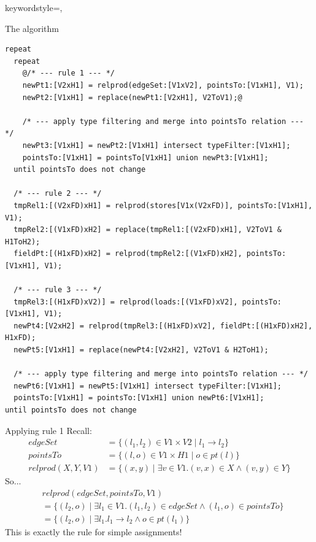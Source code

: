 \documentclass{beamer}
\begin{document}
 {
    keywordstyle=\color{red},
}

\begin{frame}[fragile]{The algorithm}
\begin{lstlisting}[style=base]
repeat
  repeat
    @/* --- rule 1 --- */
    newPt1:[V2xH1] = relprod(edgeSet:[V1xV2], pointsTo:[V1xH1], V1);
    newPt2:[V1xH1] = replace(newPt1:[V2xH1], V2ToV1);@

    /* --- apply type filtering and merge into pointsTo relation --- */
    newPt3:[V1xH1] = newPt2:[V1xH1] intersect typeFilter:[V1xH1];
    pointsTo:[V1xH1] = pointsTo[V1xH1] union newPt3:[V1xH1];
  until pointsTo does not change

  /* --- rule 2 --- */
  tmpRel1:[(V2xFD)xH1] = relprod(stores[V1x(V2xFD)], pointsTo:[V1xH1], V1);
  tmpRel2:[(V1xFD)xH2] = replace(tmpRel1:[(V2xFD)xH1], V2ToV1 & H1ToH2);
  fieldPt:[(H1xFD)xH2] = relprod(tmpRel2:[(V1xFD)xH2], pointsTo:[V1xH1], V1);

  /* --- rule 3 --- */
  tmpRel3:[(H1xFD)xV2)] = relprod(loads:[(V1xFD)xV2], pointsTo:[V1xH1], V1);
  newPt4:[V2xH2] = relprod(tmpRel3:[(H1xFD)xV2], fieldPt:[(H1xFD)xH2], H1xFD);
  newPt5:[V1xH1] = replace(newPt4:[V2xH2], V2ToV1 & H2ToH1);

  /* --- apply type filtering and merge into pointsTo relation --- */
  newPt6:[V1xH1] = newPt5:[V1xH1] intersect typeFilter:[V1xH1];
  pointsTo:[V1xH1] = pointsTo:[V1xH1] union newPt6:[V1xH1];
until pointsTo does not change
\end{lstlisting}
\end{frame}

\begin{frame}{Applying rule 1}
Recall:
\begin{align*}
edgeSet &= \{ (l_1, l_2) \in V1 \times V2 \mid l_1 \rightarrow l_2 \} \\
pointsTo &= \{ (l, o) \in V1 \times H1 \mid o \in pt(l) \} \\
relprod(X, Y, V1) &= \{(x, y) \mid \exists v \in V1.(v, x) \in X \wedge (v, y) \in Y\}
\end{align*}
So...
\begin{align*}
&relprod(edgeSet, pointsTo, V1) \\&= \{ (l_2, o) \mid \exists l_1 \in V1. (l_1, l_2) \in edgeSet \wedge (l_1, o) \in pointsTo \} \\
&= \{ (l_2, o) \mid \exists l_1. l_1 \rightarrow l_2 \wedge o \in pt(l_1) \}
\end{align*}
This is exactly the rule for simple assignments!
\end{frame}
\end{document}
